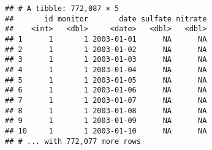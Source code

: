 \documentclass[]{article}
\begin{document}
\begin{verbatim}
## # A tibble: 772,087 × 5
##       id monitor       date sulfate nitrate
##    <int>   <dbl>     <date>   <dbl>   <dbl>
## 1      1       1 2003-01-01      NA      NA
## 2      1       1 2003-01-02      NA      NA
## 3      1       1 2003-01-03      NA      NA
## 4      1       1 2003-01-04      NA      NA
## 5      1       1 2003-01-05      NA      NA
## 6      1       1 2003-01-06      NA      NA
## 7      1       1 2003-01-07      NA      NA
## 8      1       1 2003-01-08      NA      NA
## 9      1       1 2003-01-09      NA      NA
## 10     1       1 2003-01-10      NA      NA
## # ... with 772,077 more rows
\end{verbatim}
\end{document}
